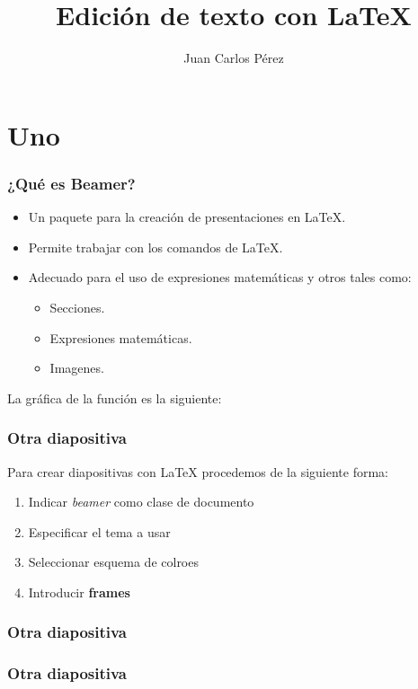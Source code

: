 \documentclass{beamer}
\title{Edición de texto con \LaTeX}
\author{Juan Carlos Pérez}
\begin{document}
\begin{frame}
		\titlepage
\end{frame}

\begin{frame}
		\tableofcontents
\end{frame}

\section{Uno}

\begin{frame}
    \frametitle{¿Qué es Beamer?}%
    \begin{itemize}
      \item Un paquete para la creación de presentaciones en \LaTeX{}. \pause 
      \item Permite trabajar con los comandos de \LaTeX{}. \pause
      \item Adecuado para el uso de expresiones matemáticas y otros tales como:
      \begin{itemize}
        \item Secciones.\pause
        \item Expresiones matemáticas.\pause
        \item Imagenes.\pause
      \end{itemize}
    \end{itemize}
\end{frame}

\begin{frame}
	La gráfica de la función es la siguiente:
	\begin{center}	
	\end{center}
\end{frame}

\begin{frame}
    \frametitle{Otra diapositiva} 
	Para crear diapositivas con \LaTeX{} procedemos de la siguiente forma:
	\begin{enumerate}
	\item Indicar \textit{beamer} como clase de documento
	\item Especificar el tema a usar
	\item Seleccionar esquema de colroes
	\item Introducir \textbf{frames}
	\end{enumerate}
\end{frame}



\begin{frame}
    \frametitle{Otra diapositiva} 
\end{frame}

\begin{frame}
    \frametitle{Otra diapositiva} 
\end{frame}
\end{document}
